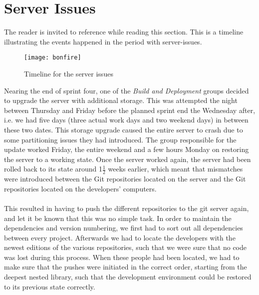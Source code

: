 
\section{Server Issues}
\label{sec:server_issues}

The reader is invited to reference  while reading this section. This is a timeline illustrating the events happened in the period with server-issues. 

\begin{figure}[!htbp]
	\centering
	\texttt{[image: bonfire]}
	\caption{Timeline for the server issues}
	\label{fig:bonefire}
\end{figure}

Nearing the end of sprint four, one of the \emph{Build and Deployment} groups decided to upgrade the server with additional storage. This was attempted the night between Thursday and Friday before the planned sprint end the Wednesday after, i.e. we had five days (three actual work days and two weekend days) in between these two dates. This storage upgrade caused the entire server to crash due to some partitioning issues they had introduced. The group responsible for the update worked Friday, the entire weekend and a few hours Monday on restoring the server to a working state. Once the server worked again, the server had been rolled back to its state around 1$\frac{1}{2}$ weeks earlier, which meant that mismatches were introduced between the Git repositories located on the server and the Git repositories located on the developers' computers. 
\\\\
This resulted in having to push the different repositories to the git server again, and let it be known that this was no simple task. In order to maintain the dependencies and version numbering, we first had to sort out all dependencies between every project. Afterwards we had to locate the developers with the newest editions of the various repositories, such that we were sure that no code was lost during this process. When these people had been located, we had to make sure that the pushes were initiated in the correct order, starting from the deepest nested library, such that the development environment could be restored to its previous state correctly.

